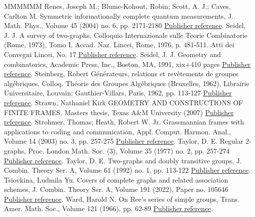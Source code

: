 \documentclass[11pt]{article}
\theoremstyle{definition}
\numberwithin{equation}{section}
\begin{document}
\begin{thebibliography}{MMMMMM}
 Renes, Joseph M.; Blume-Kohout, Robin; Scott, A. J.; Caves, Carlton M. Symmetric informationally complete quantum measurements, J. Math. Phys., Volume 45 (2004) no. 6, pp. 2171-2180 \href{https://alco.centre-mersenne.org/articles/10.5802/alco.324/#RenesBlumeKohoutScottCaves:04}{Publisher reference}.
 Seidel, J. J. A survey of two-graphs, Colloquio Internazionale sulle Teorie Combinatorie (Rome, 1973), Tomo I, Accad. Naz. Lincei, Rome, 1976, p. 481-511. Atti dei Convegni Lincei, No. 17 \href{https://alco.centre-mersenne.org/articles/10.5802/alco.324/#Seidel:76}{Publisher reference}.
 Seidel, J. J. Geometry and combinatorics, Academic Press, Inc., Boston, MA, 1991, xix+410 pages \href{https://alco.centre-mersenne.org/articles/10.5802/alco.324/#Seidel:91}{Publisher reference}.
 Steinberg, Robert Générateurs, relations et revêtements de groupes algébriques, Colloq. Théorie des Groupes Algébriques (Bruxelles, 1962), Librairie Universitaire, Louvain; Gauthier-Villars, Paris, 1962, pp. 113-127 \href{https://alco.centre-mersenne.org/articles/10.5802/alco.324/#Steinberg:62}{Publisher reference}.
 Strawn, Nathaniel Kirk GEOMETRY AND CONSTRUCTIONS OF FINITE FRAMES, Masters thesis, Texas A\&M University (2007) \href{https://alco.centre-mersenne.org/articles/10.5802/alco.324/#Strawn:07}{Publisher reference}.
 Strohmer, Thomas; Heath, Robert W. Jr. Grassmannian frames with applications to coding and communication, Appl. Comput. Harmon. Anal., Volume 14 (2003) no. 3, pp. 257-275 \href{https://alco.centre-mersenne.org/articles/10.5802/alco.324/#StrohmerHeath:03}{Publisher reference}.
 Taylor, D. E. Regular 2-graphs, Proc. London Math. Soc. (3), Volume 35 (1977) no. 2, pp. 257-274 \href{https://alco.centre-mersenne.org/articles/10.5802/alco.324/#Taylor:77}{Publisher reference}.
 Taylor, D. E. Two-graphs and doubly transitive groups, J. Combin. Theory Ser. A, Volume 61 (1992) no. 1, pp. 113-122 \href{https://alco.centre-mersenne.org/articles/10.5802/alco.324/#Taylor:92}{Publisher reference}.
 Tsiovkina, Ludmila Yu. Covers of complete graphs and related association schemes, J. Combin. Theory Ser. A, Volume 191 (2022), Paper no. 105646 \href{https://alco.centre-mersenne.org/articles/10.5802/alco.324/#Tsiovkina:22}{Publisher reference}.
 Ward, Harold N. On Ree’s series of simple groups, Trans. Amer. Math. Soc., Volume 121 (1966), pp. 62-89 \href{https://alco.centre-mersenne.org/articles/10.5802/alco.324/#Ward:66}{Publisher reference}.

\end{thebibliography}
\end{document}
